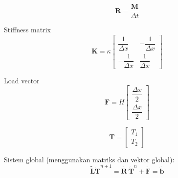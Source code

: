 \begin{equation*}
\mathbf{R} = \frac{\mathbf{M}}{\Delta t}
\end{equation*}


Stiffness matrix
\begin{equation*}
\mathbf{K} = \kappa\begin{bmatrix}
\dfrac{1}{\Delta x} & -\dfrac{1}{\Delta x} \\[0.4cm]
-\dfrac{1}{\Delta x} & \dfrac{1}{\Delta x}
\end{bmatrix}
\end{equation*}



Load vector
\begin{equation*}
\mathbf{F} = H\begin{bmatrix}
\dfrac{\Delta x}{2} \\
\dfrac{\Delta x}{2}
\end{bmatrix}
\end{equation*}

$$
\mathbf{T} = \begin{bmatrix}
T_1 \\ T_2
\end{bmatrix}
$$

Sistem global (menggunakan matriks dan vektor global):
$$
\tilde{\mathbf{L}} \tilde{\mathbf{T}}^{n+1} = \tilde{\mathbf{R}}\ 
\tilde{\mathbf{T}}^{n} + \tilde{\mathbf{F}} = \tilde{\mathbf{b}}
$$

%
%


